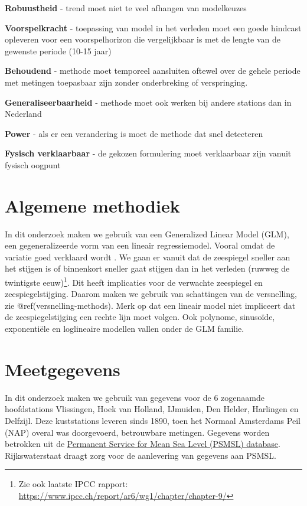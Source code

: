 \documentclass[ddraft]{deltares_report}
\begin{document}
\textbf{Robuustheid} - trend moet niet te veel afhangen van modelkeuzes

\textbf{Voorspelkracht} - toepassing van model in het verleden moet een
goede hindcast opleveren voor een voorspelhorizon die vergelijkbaar is
met de lengte van de gewenste periode (10-15 jaar)

\textbf{Behoudend} - methode moet temporeel aansluiten oftewel over de
gehele periode met metingen toepasbaar zijn zonder onderbreking of
verspringing.

\textbf{Generaliseerbaarheid} - methode moet ook werken bij andere
stations dan in Nederland

\textbf{Power} - als er een verandering is moet de methode dat snel
detecteren

\textbf{Fysisch verklaarbaar} - de gekozen formulering moet verklaarbaar
zijn vanuit fysisch oogpunt

\section{Algemene methodiek}\label{algemene-methodiek}

In dit onderzoek maken we gebruik van een
Generalized Linear Model (GLM), een gegeneralizeerde vorm van een
lineair regressiemodel. Vooral omdat de variatie goed verklaard wordt
\citep{Watson2016}. We gaan er vanuit dat de zeespiegel sneller aan het
stijgen is of binnenkort sneller gaat stijgen dan in het verleden
(ruwweg de twintigste eeuw)\footnote{Zie ook laatste IPCC rapport:
  \url{https://www.ipcc.ch/report/ar6/wg1/chapter/chapter-9/}}. Dit
heeft implicaties voor de verwachte zeespiegel en zeespiegelstijging.
Daarom maken we gebruik van schattingen van de versnelling, zie
@ref(versnelling-methods). Merk op dat een lineair model niet impliceert
dat de zeespiegelstijging een rechte lijn moet volgen. Ook polynome,
sinusoïde, exponentiële en loglineaire modellen vallen onder de GLM
familie.

\section{Meetgegevens}\label{bronnen}

In dit onderzoek maken we gebruik van gegevens voor de 6 zogenaamde
hoofdstations Vlissingen, Hoek van Holland, IJmuiden, Den Helder,
Harlingen en Delfzijl. Deze kuststations leveren sinds 1890, toen het
Normaal Amsterdams Peil (NAP) overal was doorgevoerd, betrouwbare
metingen. Gegevens worden betrokken uit de
\href{https://psmsl.org/data/}{Permanent Service for Mean Sea Level (PSMSL)
database}. Rijkswaterstaat draagt zorg voor de aanlevering van gegevens
aan PSMSL.
\end{document}
